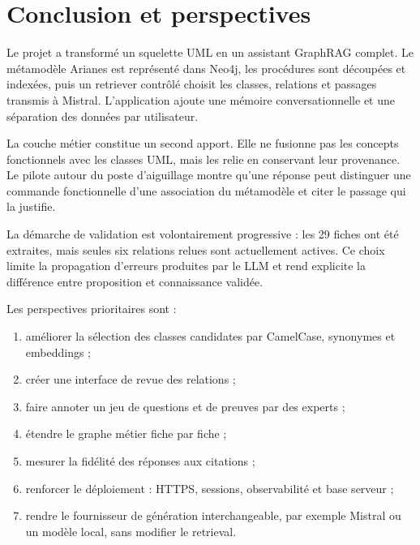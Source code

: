 \chapter{Conclusion et perspectives}

Le projet a transformé un squelette UML en un assistant GraphRAG complet. Le métamodèle Arianes est représenté dans Neo4j, les procédures sont découpées et indexées, puis un retriever contrôlé choisit les classes, relations et passages transmis à Mistral. L'application ajoute une mémoire conversationnelle et une séparation des données par utilisateur.

La couche métier constitue un second apport. Elle ne fusionne pas les concepts fonctionnels avec les classes UML, mais les relie en conservant leur provenance. Le pilote autour du poste d'aiguillage montre qu'une réponse peut distinguer une commande fonctionnelle d'une association du métamodèle et citer le passage qui la justifie.

La démarche de validation est volontairement progressive : les 29 fiches ont été extraites, mais seules six relations relues sont actuellement actives. Ce choix limite la propagation d'erreurs produites par le LLM et rend explicite la différence entre proposition et connaissance validée.

Les perspectives prioritaires sont :

\begin{enumerate}
  \item améliorer la sélection des classes candidates par CamelCase, synonymes et embeddings ;
  \item créer une interface de revue des relations  ;
  \item faire annoter un jeu de questions et de preuves par des experts ;
  \item étendre le graphe métier fiche par fiche ;
  \item mesurer la fidélité des réponses aux citations ;
  \item renforcer le déploiement : HTTPS, sessions, observabilité et base serveur ;
  \item rendre le fournisseur de génération interchangeable, par exemple Mistral ou un modèle local, sans modifier le retrieval.
\end{enumerate}


